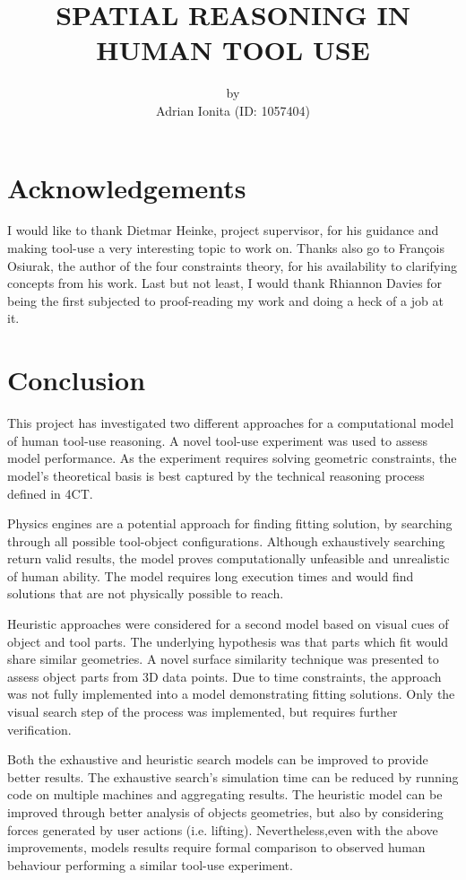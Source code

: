 \documentclass[
    a4paper,
    man,
    donotrepeattitle,
    floatsintext,
    british
]{apa6}
\title{SPATIAL REASONING IN HUMAN TOOL USE}
\author{
  \small{by}\\
  Adrian Ionita (ID: 1057404)
}
\affiliation{Supervisor: Dietmar Heinke\\
\vfill
\texttt{[image: figures/bham\_logo.png]}
\vfill
Submitted in partial fulfilment\\
of the requirements for the degree of\\ 
Master of Science
\vfill
School of Psychology\\
University of Birmingham\\
Birmingham, UK\\
September 2016
}
\begin{document}
\thispagestyle{otherpage}
\maketitle

\section{\normalfont Acknowledgements}
I would like to thank Dietmar Heinke, project supervisor, for his guidance and making tool-use a very interesting topic to work on. 
Thanks also go to Fran\c{c}ois Osiurak, the author of the four constraints theory, for his availability to clarifying concepts from his work. 
Last but not least, I would thank Rhiannon Davies for being the first subjected to proof-reading my work and doing a heck of a job at it.
\clearpage


\tableofcontents
\clearpage
\listoffigures
\clearpage



\section{Conclusion}

This project has investigated two different approaches for a computational model of human tool-use reasoning.
A novel tool-use experiment was used to assess model performance.
As the experiment requires solving geometric constraints, the model's theoretical basis is best captured by the technical reasoning process defined in 4CT. 

Physics engines are a potential approach for finding fitting solution, by searching through all possible tool-object configurations.  
Although exhaustively searching return valid results, the model proves computationally unfeasible and unrealistic of human ability. 
The model requires long execution times and would find solutions that are not physically possible to reach. 

Heuristic approaches were considered for a second model based on visual cues of object and tool parts.  
The underlying hypothesis was that parts which fit would share similar geometries. 
A novel surface similarity technique was presented to assess object parts from 3D data points.
Due to time constraints, the approach was not fully implemented into a model demonstrating fitting solutions.
Only the visual search step of the process was implemented, but requires further verification.

Both the exhaustive and heuristic search models can be improved to provide better results.
The exhaustive search's simulation time can be reduced by running code on multiple machines and aggregating results.
The heuristic model can be improved through better analysis of objects geometries, but also by considering forces generated by user actions (i.e. lifting).
Nevertheless,even with the above improvements, models results require formal comparison to observed human behaviour performing a similar tool-use experiment.  

\clearpage


\shorttitle{}
\printbibliography
\end{document}

